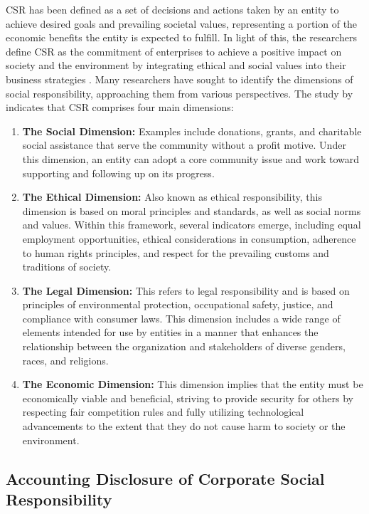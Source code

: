 \documentclass[10pt]{NSP1}
\begin{document}
	CSR has been defined as a set of decisions and actions taken by an entity to achieve desired goals and prevailing societal values, representing a portion of the economic benefits the entity is expected to fulfill. In light of this, the researchers define CSR as the commitment of enterprises to achieve a positive impact on society and the environment by integrating ethical and social values into their business strategies \cite{Ali2023,Ismail2022, Nugroho2021, Nyore2021}. Many researchers have sought to identify the dimensions of social responsibility, approaching them from various perspectives. The study by \cite{Saleh2021} indicates that CSR comprises four main dimensions:
	\begin{enumerate}
		\item \textbf{The Social Dimension:} Examples include donations, grants, and charitable social assistance that serve the community without a profit motive. Under this dimension, an entity can adopt a core community issue and work toward supporting and following up on its progress.
		\item \textbf{The Ethical Dimension:} Also known as ethical responsibility, this dimension is based on moral principles and standards, as well as social norms and values. Within this framework, several indicators emerge, including equal employment opportunities, ethical considerations in consumption, adherence to human rights principles, and respect for the prevailing customs and traditions of society.
		\item \textbf{The Legal Dimension:} This refers to legal responsibility and is based on principles of environmental protection, occupational safety, justice, and compliance with consumer laws. This dimension includes a wide range of elements intended for use by entities in a manner that enhances the relationship between the organization and stakeholders of diverse genders, races, and religions.
		\item \textbf{The Economic Dimension:} This dimension implies that the entity must be economically viable and beneficial, striving to provide security for others by respecting fair competition rules and fully utilizing technological advancements to the extent that they do not cause harm to society or the environment.
	\end{enumerate}
	
	\subsection{Accounting Disclosure of Corporate Social Responsibility}
	
\end{document}
